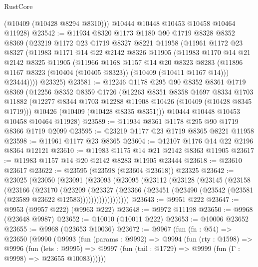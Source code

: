 \begin{lexlean}{RustCore}
\begin{coremodule}
        (@10409 (@10428 @8294 @8310)))
      @10444
      @10448
      @10453
      @10458
      @10464
      @11928)
@23542 := @11934
    @8320
    @1173
    @1180
    @90
    @1719
    @8328
    @8352
    @8369
    (@23219
      @1172
      @23
      @1719
      @8327
      @8221
      @11958
      (@11961
        @1172
        @23
        @8327
        (@11983
          @1171
          @14
          @22
          @2142
          @8326
          @11905
          (@11983
            @1170
            @14
            @21
            @2142
            @8325
            @11905
            (@11966
              @1168
              @1157
              @14
              @20
              @8323
              @8283
              (@11896 @1167 @8323 (@10404 (@10405 @8323)) (@10409 (@10411 @1167 @14)))
              @23444))))
      @23325)
@23581 := @12246
    @1178
    @295
    @90
    @8352
    @8361
    @1719
    @8369
    (@12256
      @8352
      @8359
      @1726
      (@12263
        @8351
        @8358
        @1697
        @8334
        @1703
        @11882
        (@12277 @8344 @1703 @12288 @11908 @10426 (@10409 (@10428 @8345 @1719)))
        @10426
        (@10409 (@10428 @8335 @8351)))
      @10444
      @10448
      @10453
      @10458
      @10464
      @11928)
@23589 := @11934 @8361 @1178 @295 @90 @1719 @8366 @1719 @2099
@23595 := @23219 @1177 @23 @1719 @8365 @8221 @11958
@23598 := @11961 @1177 @23 @8365
@23604 := @12107 @1176 @14 @22 @2196 @8364 @12121
@23610 := @11983 @1175 @14 @21 @2142 @8363 @11905
@23617 := @11983 @1157 @14 @20 @2142 @8283 @11905 @23444
@23618 := @23610 @23617
@23622 := @23595 (@23598 (@23604 @23618)) @23325
@23642 := @23025
    (@23050
      (@23091
        (@23093
          (@23095
            (@23112
              (@23128
                (@23145
                  (@23158
                    (@23166
                      (@23170
                        (@23209
                          (@23327
                            (@23366
                              (@23451
                                (@23490 (@23542 (@23581 (@23589 @23622 @12583))))))))))))))))))
@23643 := @9951 @222
@23647 := @9953 (@9957 @222) (@9963 @222)
@23648 := @9972 @11198
@23650 := @9968 (@23648 @9987)
@23652 := @10010 (@10011 @222)
@23653 := @10006 @23652
@23655 := @9968 (@23653 @10036)
@23672 := @9967
    (fun (fn : @54) =>
    @23650
      (@9990
        (@9993
          (fun (params : @9992) =>
          @9994
            (fun (rty : @1598) =>
            @9996
              (fun (lets : @9995) =>
              @9997 (fun (tail : @1729) => @9999 (fun (Γ : @9998) => @23655 @10083))))))

\end{coremodule}
\end{lexlean}
